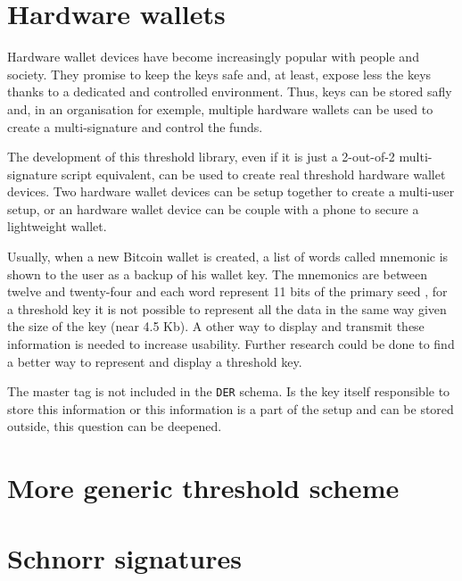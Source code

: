 \section{Hardware wallets}

Hardware wallet devices have become increasingly popular with people and society. They
promise to keep the keys safe and, at least, expose less the keys thanks to a
dedicated and controlled environment. Thus, keys can be stored safly and, in an
organisation for exemple, multiple hardware wallets can be used to create a
multi-signature and control the funds.

The development of this threshold library, even if it is just a 2-out-of-2
multi-signature script equivalent, can be used to create real threshold hardware
wallet devices. Two hardware wallet devices can be setup together to create a
multi-user setup, or an hardware wallet device can be couple with a phone to secure
a lightweight wallet.

Usually, when a new Bitcoin wallet is created, a list of words called mnemonic is
shown to the user as a backup of his wallet key. The mnemonics are between twelve
and twenty-four and each word represent 11 bits of the primary seed \cite{Mnemonic},
for a threshold key it is not possible to represent all the data in the same way
given the size of the key (near 4.5 Kb). A other way to display and transmit these
information is needed to increase usability. Further research could be done to find
a better way to represent and display a threshold key.

The master tag is not included in the \texttt{DER} schema. Is the key itself responsible
to store this information or this information is a part of the setup and can be stored
outside, this question can be deepened.

\section{More generic threshold scheme}


\section{Schnorr signatures}

